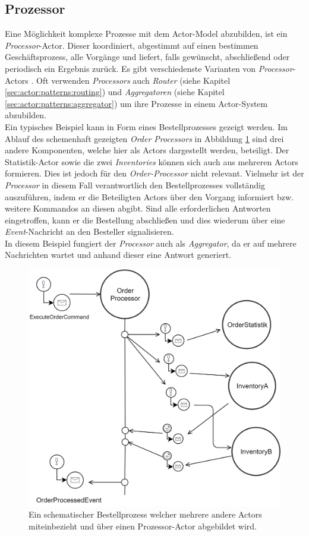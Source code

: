 \subsection{Prozessor}\label{sub:actor:patterns:processor}
Eine Möglichkeit komplexe Prozesse mit dem Actor-Model abzubilden, ist ein \textit{Processor}-Actor. Dieser koordiniert, abgestimmt auf einen bestimmen Geschäftsprozess, alle Vorgänge und liefert, falls gewünscht, abschließend oder periodisch ein Ergebnis zurück. Es gibt verschiedenste Varianten von \textit{Processor}-Actors \citep{Vernon2015ReactiveAkka}.
Oft verwenden \textit{Processors} auch \textit{Router} (siehe Kapitel \ref{sec:actor:patterns:routing}) und \textit{Aggregatoren} (siehe Kapitel \ref{sec:actor:patterns:aggregator}) um ihre Prozesse in einem Actor-System abzubilden. \\
Ein typisches Beispiel kann in Form eines Bestellprozesses gezeigt werden. Im Ablauf des schemenhaft gezeigten \textit{Order Processors} in Abbildung \ref{fig:actor:patterns:orderProcesseor} sind drei andere Komponenten, welche hier als Actors dargestellt werden, beteiligt. Der Statistik-Actor sowie die zwei \textit{Inventories} können sich auch aus mehreren Actors formieren. Dies ist jedoch für den \textit{Order-Processor} nicht relevant. Vielmehr ist der \textit{Processor} in diesem Fall verantwortlich den Bestellprozesses vollständig auszuführen, indem er die Beteiligten Actors über den Vorgang informiert bzw. weitere Kommandos an diesen abgibt. Sind alle erforderlichen Antworten eingetroffen, kann er die Bestellung abschließen und dies wiederum über eine \textit{Event}-Nachricht an den Besteller signalisieren. \\
In diesem Beispiel fungiert der \textit{Processor} auch als \textit{Aggregator}, da er auf mehrere Nachrichten wartet und anhand dieser eine Antwort generiert. 

\begin{figure}
  \centering
  \includegraphics[width=0.9\linewidth]{gfx/actor/patterns/simpleOrderProcesor}
  \caption{Ein schematischer Bestellprozess welcher mehrere andere Actors miteinbezieht und über einen Prozessor-Actor abgebildet wird.}
  \label{fig:actor:patterns:orderProcesseor}
\end{figure}

